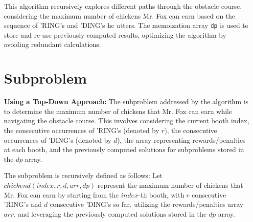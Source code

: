 \documentclass[8pt]{article}
\begin{document}
This algorithm recursively explores different paths through the obstacle course, considering the maximum number of chickens Mr. Fox can earn based on the sequence of 'RING's and 'DING's he utters. The memoization array \texttt{dp} is used to store and re-use previously computed results, optimizing the algorithm by avoiding redundant calculations.









\section{Subproblem}

\textbf{Using a Top-Down Approach:} The subproblem addressed by the algorithm is to determine the maximum number of chickens that Mr. Fox can earn while navigating the obstacle course. This involves considering the current booth index, the consecutive occurrences of 'RING's (denoted by $r$), the consecutive occurrences of 'DING's (denoted by $d$), the array representing rewards/penalties at each booth, and the previously computed solutions for subproblems stored in the $dp$ array.

The subproblem is recursively defined as follows: Let 
\newline
\newline
\phantom{fddvddjndnjdnjhjddndjnsndjnjdjdssvs}\textit{\textbf{$chickend(index, r, d, arr, dp)$} }
\newline
\newline
represent the maximum number of chickens that Mr. Fox can earn by starting from the $index$-th booth, with $r$ consecutive 'RING's and $d$ consecutive 'DING's so far, utilizing the rewards/penalties array $arr$, and leveraging the previously computed solutions stored in the $dp$ array.
\end{document}
